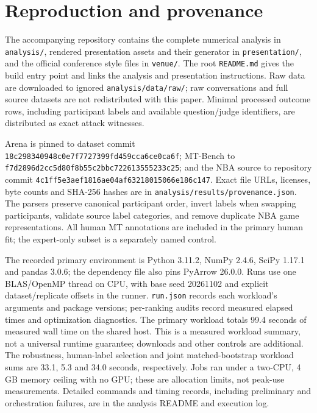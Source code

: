 \section{Reproduction and provenance}
\label{app:reproduction}
The accompanying repository contains the complete numerical analysis in \texttt{analysis/}, rendered presentation assets and their generator in \texttt{presentation/}, and the official conference style files in \texttt{venue/}. The root \texttt{README.md} gives the build entry point and links the analysis and presentation instructions. Raw data are downloaded to ignored \texttt{analysis/data/raw/}; raw conversations and full source datasets are not redistributed with this paper. Minimal processed outcome rows, including participant labels and available question/judge identifiers, are distributed as exact attack witnesses.

Arena is pinned to dataset commit \texttt{18c298340948c0e7f7727399fd459cca6ce0ca6f}; MT-Bench to \texttt{f7d2896d2cc5d80f8b55c2bbc722613555233c25}; and the NBA source to repository commit \texttt{4c1ff5e3aef1816ae04af63218015066e186c147}. Exact file URLs, licenses, byte counts and SHA-256 hashes are in \texttt{analysis/results/provenance.json}. The parsers preserve canonical participant order, invert labels when swapping participants, validate source label categories, and remove duplicate NBA game representations. All human MT annotations are included in the primary human fit; the expert-only subset is a separately named control.

The recorded primary environment is Python 3.11.2, NumPy 2.4.6, SciPy 1.17.1 and pandas 3.0.6; the dependency file also pins PyArrow 26.0.0. Runs use one BLAS/OpenMP thread on CPU, with base seed 20261102 and explicit dataset/replicate offsets in the runner. \texttt{run.json} records each workload's arguments and package versions; per-ranking audits record measured elapsed times and optimization diagnostics. The primary workload totals 99.4 seconds of measured wall time on the shared host. This is a measured workload summary, not a universal runtime guarantee; downloads and other controls are additional. The robustness, human-label selection and joint matched-bootstrap workload sums are 33.1, 5.3 and 34.0 seconds, respectively. Jobs ran under a two-CPU, 4 GB memory ceiling with no GPU; these are allocation limits, not peak-use measurements. Detailed commands and timing records, including preliminary and orchestration failures, are in the analysis README and execution log.

